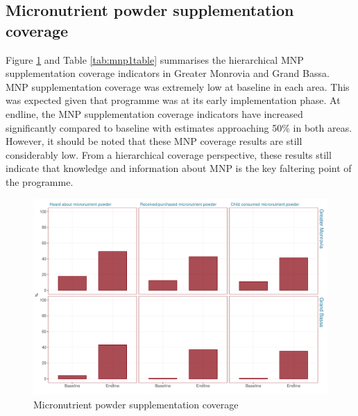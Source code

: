 \documentclass[12pt,a4paper]{article}
\begin{document}
\newpage

\hypertarget{micronutrient-powder-supplementation-coverage}{%
\subsection{Micronutrient powder supplementation coverage}\label{micronutrient-powder-supplementation-coverage}}

Figure \ref{fig:mnp1plot} and Table \ref{tab:mnp1table} summarises the hierarchical MNP supplementation coverage indicators in Greater Monrovia and Grand Bassa. MNP supplementation coverage was extremely low at baseline in each area. This was expected given that programme was at its early implementation phase. At endline, the MNP supplementation coverage indicators have increased significantly compared to baseline with estimates approaching 50\% in both areas. However, it should be noted that these MNP coverage results are still considerably low. From a hierarchical coverage perspective, these results still indicate that knowledge and information about MNP is the key faltering point of the programme.

\begin{figure}[H]

{\centering \includegraphics{liberiaCoverageFinalReport_files/figure-latex/mnp1plot-1} 

}

\caption{Micronutrient powder supplementation coverage}\label{fig:mnp1plot}
\end{figure}
\end{document}
